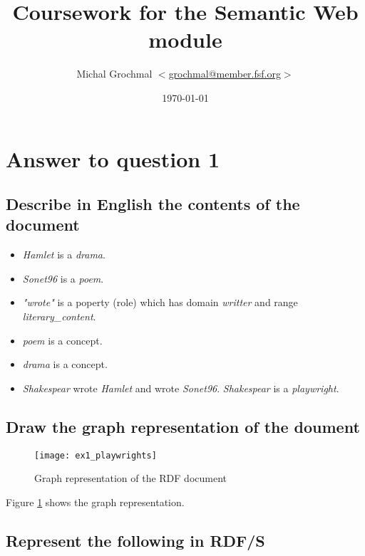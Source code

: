 \documentclass[a4paper,12pt]{article}
\title{Coursework for the Semantic Web module}
\author{Michal Grochmal
  $<$\href{mailto:grochmal@member.fsf.org}{grochmal@member.fsf.org}$>$
}
\date{\today}
\begin{document}
\maketitle

\section[Queation 1]{Answer to question 1}
\subsection[Describe]{Describe in English the contents of the document}
\begin{itemize}

\item[] \emph{Hamlet} is a \emph{drama}.

\item[] \emph{Sonet96} is a \emph{poem}.

\item[] \emph{"wrote"} is a poperty (role) which has domain \emph{writter} and
range \emph{literary\_content}.

\item[] \emph{poem} is a concept.

\item[] \emph{drama} is a concept.

\item[] \emph{Shakespear} wrote \emph{Hamlet} and wrote \emph{Sonet96}.
\emph{Shakespear} is a \emph{playwright}.

\end{itemize}

\newpage
\subsection[Draw]{Draw the graph representation of the doument}
\begin{figure}[!htp]
\centering
\texttt{[image: ex1\_playwrights]}
\caption{Graph representation of the RDF document}
\label{shakespear}
\end{figure}
Figure \ref{shakespear} shows the graph representation.

\subsection[RDF/S]{Represent the following in RDF/S}
\end{document}
